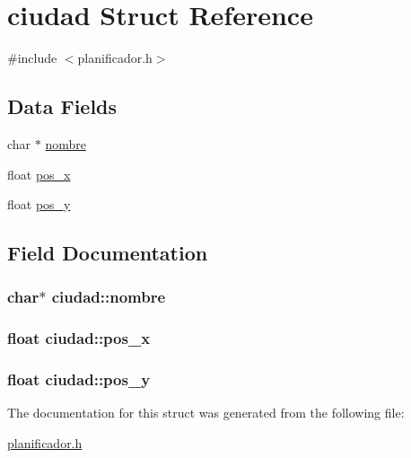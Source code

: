 \hypertarget{structciudad}{\section{ciudad Struct Reference}
\label{structciudad}
}


{\ttfamily \#include $<$planificador.\+h$>$}

\subsection*{Data Fields}
\begin{DoxyCompactItemize}
\item 
char $\ast$ \hyperlink{structciudad_a2bbd6f5dd106f1386a7ce314077a0bfc}{nombre}
\item 
float \hyperlink{structciudad_ab93cfa092c098f1a1df037dc625eed22}{pos\+\_\+x}
\item 
float \hyperlink{structciudad_ad67083332a69d03a3c32806ee388d2dc}{pos\+\_\+y}
\end{DoxyCompactItemize}


\subsection{Field Documentation}
\hypertarget{structciudad_a2bbd6f5dd106f1386a7ce314077a0bfc}{
\subsubsection[{nombre}]{\setlength{\rightskip}{0pt plus 5cm}char$\ast$ ciudad\+::nombre}}\label{structciudad_a2bbd6f5dd106f1386a7ce314077a0bfc}
\hypertarget{structciudad_ab93cfa092c098f1a1df037dc625eed22}{
\subsubsection[{pos\+\_\+x}]{\setlength{\rightskip}{0pt plus 5cm}float ciudad\+::pos\+\_\+x}}\label{structciudad_ab93cfa092c098f1a1df037dc625eed22}
\hypertarget{structciudad_ad67083332a69d03a3c32806ee388d2dc}{
\subsubsection[{pos\+\_\+y}]{\setlength{\rightskip}{0pt plus 5cm}float ciudad\+::pos\+\_\+y}}\label{structciudad_ad67083332a69d03a3c32806ee388d2dc}


The documentation for this struct was generated from the following file\+:\begin{DoxyCompactItemize}
\item 
\hyperlink{planificador_8h}{planificador.\+h}\end{DoxyCompactItemize}

